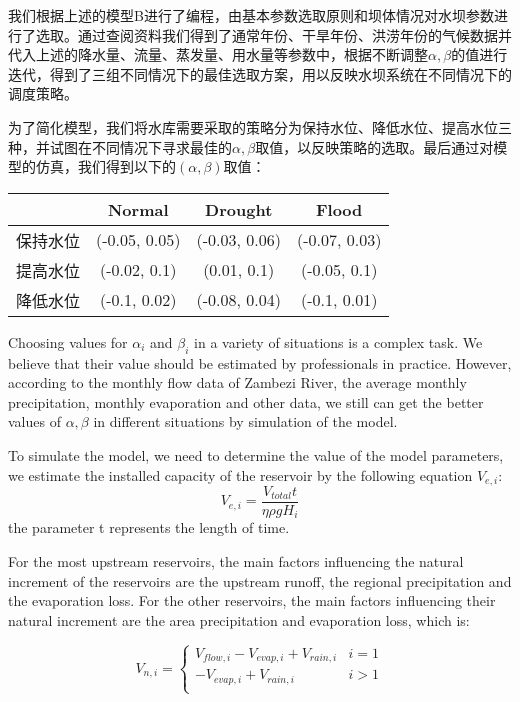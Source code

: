 \documentclass[nocover]{cumcmart}
\begin{document}
我们根据上述的模型B进行了编程，由基本参数选取原则和坝体情况对水坝参数进行了选取。通过查阅资料我们得到了通常年份、干旱年份、洪涝年份的气候数据并代入上述的降水量、流量、蒸发量、用水量等参数中，根据不断调整$\alpha,\beta$的值进行迭代，得到了三组不同情况下的最佳选取方案，用以反映水坝系统在不同情况下的调度策略。

为了简化模型，我们将水库需要采取的策略分为保持水位、降低水位、提高水位三种，并试图在不同情况下寻求最佳的$\alpha,\beta$取值，以反映策略的选取。最后通过对模型的仿真，我们得到以下的$(\alpha,\beta)$取值：

\begin{table}[!hbp]
\centering
\begin{tabular}{|c|c|c|c|}
\hline
  & Normal & Drought & Flood \\
\hline
保持水位 & (-0.05, 0.05) & (-0.03, 0.06) & (-0.07, 0.03) \\
\hline
提高水位 & (-0.02, 0.1) & (0.01, 0.1) & (-0.05, 0.1)  \\
\hline
降低水位 & (-0.1, 0.02) & (-0.08, 0.04) & (-0.1, 0.01) \\
\hline
\end{tabular}
\end{table}



Choosing values for $ \alpha_ {i} $ and $ \beta_ {i} $ in a variety of situations is a complex task. We believe that their value should be estimated by professionals in practice. However, according to the monthly flow data of Zambezi River, the average monthly precipitation, monthly evaporation and other data, we still can get the better values of $ \alpha, \beta $ in different situations by simulation of the model. 

To simulate the model, we need to determine the value of the model parameters, we estimate the installed capacity of the reservoir by the following equation $V_{e, i}$:
\begin{equation}
V_{e, i} = \frac{V_{total}t}{\eta \rho gH_{i}}
\end{equation}
the parameter t represents the length of time.

For the most upstream reservoirs, the main factors influencing the natural increment of the reservoirs are the upstream runoff, the regional precipitation and the evaporation loss. For the other reservoirs, the main factors influencing their natural increment are the area precipitation and evaporation loss, which is:

\begin{equation}
V_{n,i} = \left\{
\begin{array}{cc}
V_{flow,i} - V_{evap,i} + V_{rain,i} & i = 1 \\
-V_{evap,i} + V_{rain,i} & i > 1 \\
\end{array}
\right.
\end{equation}
\end{document}
